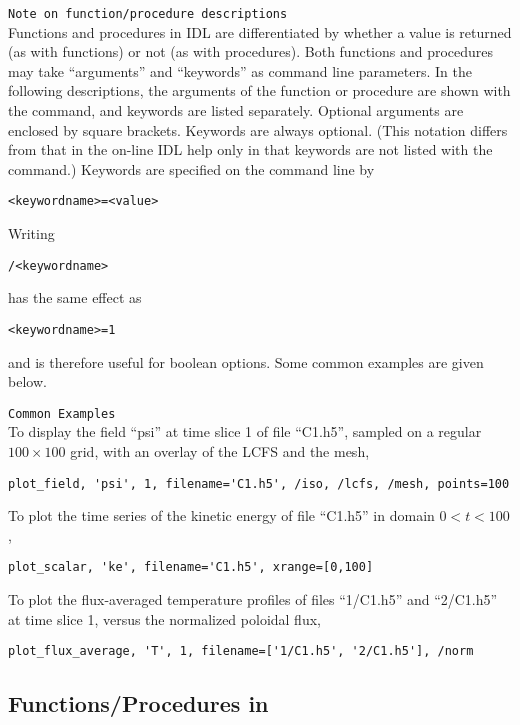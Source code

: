 \texttt{Note on function/procedure descriptions}
\\
Functions and procedures in IDL are differentiated by whether a value
is returned (as with functions) or not (as with procedures).  Both
functions and procedures may take ``arguments'' and ``keywords'' as
command line parameters.  In the following descriptions, the arguments
of the function or procedure are shown with the command, and keywords
are listed separately.  Optional arguments are enclosed by square
brackets.  Keywords are always optional.  (This notation differs from
that in the on-line IDL help only in that keywords are not listed with
the command.)  Keywords are specified on the command line by
\begin{verbatim}
<keywordname>=<value>
\end{verbatim}
Writing
\begin{verbatim}
/<keywordname> 
\end{verbatim}
has the same effect as
\begin{verbatim}
<keywordname>=1
\end{verbatim}
and is therefore useful for boolean options.  Some common examples are
given below.


\texttt{Common Examples}
\\
To display the field ``psi'' at time slice 1 of file ``C1.h5'',
sampled on a regular $100\times100$ grid, with an overlay of the LCFS
and the mesh,
\begin{verbatim}
plot_field, 'psi', 1, filename='C1.h5', /iso, /lcfs, /mesh, points=100
\end{verbatim}

To plot the time series of the kinetic energy of file ``C1.h5'' in
domain $0 < t < 100$, 
\begin{verbatim}
plot_scalar, 'ke', filename='C1.h5', xrange=[0,100]
\end{verbatim}

To plot the flux-averaged temperature profiles of files ``1/C1.h5''
and ``2/C1.h5'' at time slice 1, versus the normalized poloidal flux,
\begin{verbatim}
plot_flux_average, 'T', 1, filename=['1/C1.h5', '2/C1.h5'], /norm
\end{verbatim}


\subsection{Functions/Procedures in }

